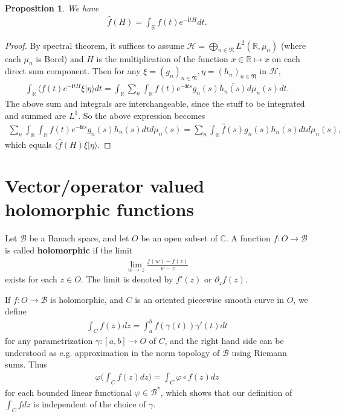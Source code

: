 \documentclass[12pt,a4paper,notitlepage]{article}
\theoremstyle{definition}
\theoremstyle{plain}
\newtheorem{pp}[df]{Proposition}
\newcommand{\fk}{\mathfrak}
\newcommand{\mc}{\mathcal}
\newcommand{\wht}{\widehat}
\newcommand{\ovl}{\overline}
\newcommand{\bk}[1]{\langle {#1}\rangle}
\newcommand{\im}{\mathbf{i}}
\newcommand{\Cbb}{\mathbb C}
\newcommand{\Rbb}{\mathbb R}
\numberwithin{equation}{section}
\begin{document}
\begin{pp}
We have
\begin{align*}
\wht f(H)=	\int_\Rbb f(t)e^{-\im tH}dt.
\end{align*}
\end{pp}



\begin{proof}
By spectral theorem, it suffices to assume $\mc H=\bigoplus_{n\in\fk N}L^2(\Rbb,\mu_n)$ (where each $\mu_n$ is Borel) and $H$ is the multiplication of the function $x\in\Rbb\mapsto x$ on each direct sum component. Then for any $\xi=(g_n)_{n\in\fk N},\eta=(h_n)_{n\in\fk N}$ in $\mc H$, 
\begin{align*}
\int_\Rbb\bk{f(t)e^{-\im tH}\xi|\eta}dt=\int_\Rbb\sum_n \int_\Rbb f(t)e^{-\im ts}g_n(s)\ovl{h_n(s)}d\mu_n(s)dt.	
\end{align*}
The above sum and integrals are interchangeable, since the stuff to be integrated and summed are $L^1$. So the above expression becomes
\begin{align*}
\sum_n \int_\Rbb \int_\Rbb f(t)e^{-\im ts}g_n(s)\ovl{h_n(s)}dt d\mu_n(s)=	\sum_n \int_\Rbb  \wht f(s)g_n(s)\ovl{h_n(s)}dt d\mu_n(s),
\end{align*}
which equals $\bk{\wht f(H)\xi|\eta}$.
\end{proof}




\appendix
\section{Vector/operator valued holomorphic functions}\label{lb55}

Let $\mc B$ be a Banach space, and let $O$ be an open subset of $\Cbb$. A function $f:O\rightarrow\mc B$ is called \textbf{holomorphic} if the limit
\begin{align*}
	\lim_{w\rightarrow z}\frac{f(w)-f(z)}{w-z}
\end{align*}
exists for each $z\in O$. The limit is denoted by $f'(z)$ or $\partial_z f(z)$.

If $f:O\rightarrow\mc B$ is holomorphic, and $C$ is an oriented piecewise smooth curve in $O$, we define
\begin{align}
\int_C f(z)dz=\int_a^b f(\gamma(t))\gamma'(t)dt	
\end{align}
for any parametrization $\gamma:[a,b]\rightarrow O$ of $C$, and the right hand side can be understood as e.g. approximation in the norm topology of $\mc B$ using Riemann sums. Thus 
\begin{align*}
\varphi\Big(\int_Cf(z)dz\Big)=\int_C \varphi\circ f(z)dz
\end{align*}
for each bounded linear functional $\varphi\in\mc B^*$, which shows that our definition of $\int_Cfdz$ is independent of the choice of $\gamma$.
\end{document}
